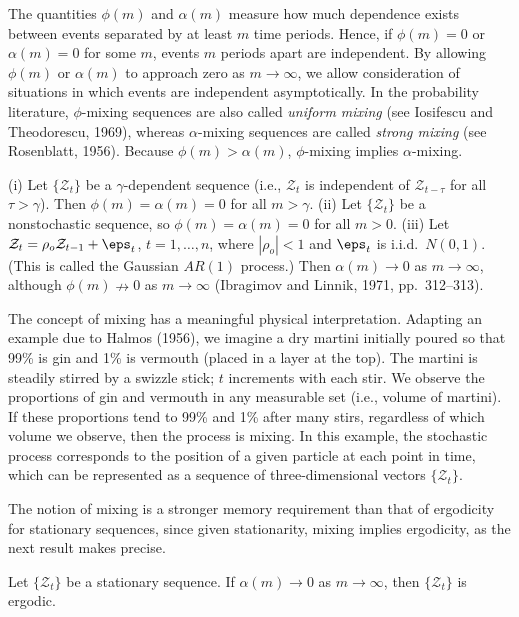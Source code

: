 The quantities $\phi(m)$ and $\alpha(m)$ measure how much dependence exists between events separated by at least $m$ time periods. Hence, if $\phi(m) = 0$ or $\alpha(m) = 0$ for some $m$, events $m$ periods apart are independent. By allowing $\phi(m)$ or $\alpha(m)$ to approach zero as $m \to \infty$, we allow consideration of situations in which events are independent asymptotically. In the probability literature, $\phi$-mixing sequences are also called \emph{uniform mixing} (see Iosifescu and Theodorescu, 1969), whereas $\alpha$-mixing sequences are called \emph{strong mixing} (see Rosenblatt, 1956). Because $\phi(m) > \alpha(m)$, $\phi$-mixing implies $\alpha$-mixing.

\begin{example}\label{ex:mixing-examples}
(i) Let $\{\mathcal{Z}_t\}$ be a $\gamma$-dependent sequence (i.e., $\mathcal{Z}_t$ is independent of $\mathcal{Z}_{t-\tau}$ for all $\tau > \gamma$). Then $\phi(m) = \alpha(m) = 0$ for all $m > \gamma$. (ii) Let $\{\mathcal{Z}_t\}$ be a nonstochastic sequence, so $\phi(m) = \alpha(m) = 0$ for all $m > 0$. (iii) Let $\mathcal{Z}_t = \rho_o \mathcal{Z}_{t-1} + \eps_t$, $t = 1, \ldots, n$, where $|\rho_o| < 1$ and $\eps_t$ is i.i.d.\ $N(0,1)$. (This is called the Gaussian $AR(1)$ process.) Then $\alpha(m) \to 0$ as $m \to \infty$, although $\phi(m) \nrightarrow 0$ as $m \to \infty$ (Ibragimov and Linnik, 1971, pp.~312--313).
\end{example}

The concept of mixing has a meaningful physical interpretation. Adapting an example due to Halmos (1956), we imagine a dry martini initially poured so that 99\% is gin and 1\% is vermouth (placed in a layer at the top). The martini is steadily stirred by a swizzle stick; $t$ increments with each stir. We observe the proportions of gin and vermouth in any measurable set (i.e., volume of martini). If these proportions tend to 99\% and 1\% after many stirs, regardless of which volume we observe, then the process is mixing. In this example, the stochastic process corresponds to the position of a given particle at each point in time, which can be represented as a sequence of three-dimensional vectors $\{\boldsymbol{\mathcal{Z}}_t\}$.

The notion of mixing is a stronger memory requirement than that of ergodicity for stationary sequences, since given stationarity, mixing implies ergodicity, as the next result makes precise.

\begin{proposition}\label{prop:mixing-implies-ergodic}
Let $\{\mathcal{Z}_t\}$ be a stationary sequence. If $\alpha(m) \to 0$ as $m \to \infty$, then $\{\mathcal{Z}_t\}$ is ergodic.
\end{proposition}

